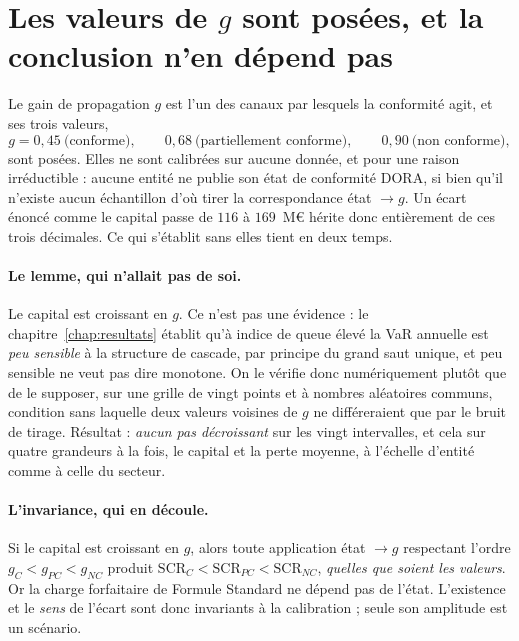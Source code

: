

\section{Les valeurs de \texorpdfstring{$g$}{g} sont posées, et la conclusion n'en dépend pas}
\label{sec:invariance-g}

Le gain de propagation $g$ est l'un des canaux par lesquels la conformité agit, et ses trois
valeurs,
\[
  g = 0{,}45 \ \text{(conforme)}, \qquad 0{,}68 \ \text{(partiellement conforme)},
  \qquad 0{,}90 \ \text{(non conforme)},
\]
sont posées. Elles ne sont calibrées sur aucune donnée, et pour une raison
irréductible : aucune entité ne publie son état de conformité DORA, si bien qu'il
n'existe aucun échantillon d'où tirer la correspondance état $\to g$. Un écart énoncé comme
\og le capital passe de $116$ à $169$~M\euro\fg{} hérite donc entièrement de ces trois décimales.
Ce qui s'établit sans elles tient en deux temps.

\paragraph{Le lemme, qui n'allait pas de soi.} Le capital est croissant en $g$. Ce
n'est pas une évidence : le chapitre~\ref{chap:resultats} établit qu'à indice de queue élevé la
VaR annuelle est \emph{peu sensible} à la structure de cascade, par principe du grand
saut unique, et peu sensible ne veut pas dire monotone. On le vérifie donc numériquement plutôt
que de le supposer, sur une grille de vingt points et à nombres aléatoires communs, condition
sans laquelle deux valeurs voisines de $g$ ne différeraient que par le bruit de tirage. Résultat :
\emph{aucun pas décroissant} sur les vingt intervalles, et cela sur quatre grandeurs à la fois,
le capital et la perte moyenne, à l'échelle d'entité comme à celle du secteur.

\paragraph{L'invariance, qui en découle.} Si le capital est croissant en $g$, alors toute
application état $\to g$ respectant l'ordre $g_C < g_{PC} < g_{NC}$ produit
$\mathrm{SCR}_C < \mathrm{SCR}_{PC} < \mathrm{SCR}_{NC}$, \emph{quelles que soient les valeurs}.
Or la charge forfaitaire de Formule Standard ne dépend pas de l'état. L'existence et le
\emph{sens} de l'écart sont donc invariants à la calibration ; seule son amplitude
est un scénario.

